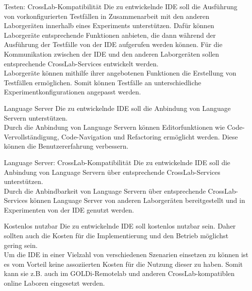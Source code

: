 \begin{requirement}{Testen: CrossLab-Kompatibilität}
    \reqdescription Die zu entwickelnde IDE soll die Ausführung von vorkonfigurierten Testfällen in Zusammenarbeit mit den anderen Laborgeräten innerhalb eines Experiments unterstützen. Dafür können Laborgeräte entsprechende Funktionen anbieten, die dann während der Ausführung der Testfälle von der IDE aufgerufen werden können. Für die Kommunikation zwischen der IDE und den anderen Laborgeräten sollen entsprechende CrossLab-Services entwickelt werden. \\
    \reqrationale Laborgeräte können mithilfe ihrer angebotenen Funktionen die Erstellung von Testfällen ermöglichen. Somit können Testfälle an unterschiedliche Experimentkonfigurationen angepasst werden. \\
\end{requirement}

\begin{requirement}{Language Server}
    \reqdescription Die zu entwickelnde IDE soll die Anbindung von Language Servern unterstützen. \\
    \reqrationale Durch die Anbindung von Language Servern können Editorfunktionen wie Code-Vervollständigung, Code-Navigation und Refactoring ermöglicht werden. Diese können die Benutzererfahrung verbessern. \\
\end{requirement}

\begin{requirement}{Language Server: CrossLab-Kompatibilität}
    \reqdescription Die zu entwickelnde IDE soll die Anbindung von Language Servern über entsprechende CrossLab-Services unterstützen. \\
    \reqrationale Durch die Anbindbarkeit von Language Servern über entsprechende CrossLab-Services können Language Server von anderen Laborgeräten bereitgestellt und in Experimenten von der IDE genutzt werden. \\
\end{requirement}

\begin{requirement}{Kostenlos nutzbar}
    \reqdescription Die zu entwickelnde IDE soll kostenlos nutzbar sein. Daher sollten auch die Kosten für die Implementierung und den Betrieb möglichst gering sein. \\
    \reqrationale Um die IDE in einer Vielzahl von verschiedenen Szenarien einsetzen zu können ist es vom Vorteil keine assoziierten Kosten für die Nutzung dieser zu haben. Somit kann sie z.B. auch im GOLDi-Remotelab und anderen CrossLab-kompatiblen online Laboren eingesetzt werden. \\
\end{requirement}


